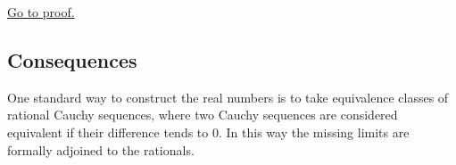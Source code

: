 \begin{remark*}[Proof]
\hyperref[prf:cauchy-not-convergent-q]{Go to proof.}
\end{remark*}

\subsection{Consequences}

\begin{remark}
\label{rem:real-motivation}
One standard way to construct the real numbers is to take equivalence classes of rational Cauchy
sequences, where two Cauchy sequences are considered equivalent if their difference tends to $0$.
In this way the missing limits are formally adjoined to the rationals.
\end{remark}
